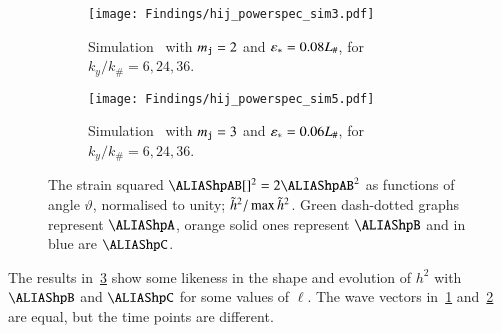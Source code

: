 
    \begin{figure}[h!]
        \centering
        \begin{subfigure}[b]{\linewidth}
            \centering
            \texttt{[image: Findings/hij\_powerspec\_sim3.pdf]}
        \caption{Simulation~ with $m_{\mathtt{j}}=2$ and $\varepsilon_\ast=0.08L_\#$, for $k_y/k_\#=6,24,36$. }
        \label{fig:results:h11:hij_powerspec_sim3}
        \end{subfigure}
        \hfill
        \begin{subfigure}[b]{\linewidth}
            \texttt{[image: Findings/hij\_powerspec\_sim5.pdf]}
        \caption{Simulation~ with $m_{\mathtt{j}}=3$ and $\varepsilon_\ast=0.06L_\#$, for $k_y/k_\#=6,24,36$.}
        \label{fig:results:h11:hij_powerspec_sim5}
        \end{subfigure}
        \caption{%
        The strain squared $\hpAB[]^2 = 2\hpAB^2$ as functions of angle $\vartheta$, normalised to unity; $\tilde{h}^2/\max{\tilde{h}^2}$. %
        Green dash-dotted graphs represent $\hpA$, orange solid ones represent $\hpB$ and in blue are $\hpC$.}
        \label{fig:results:h11:hij_powerspecs}
    \end{figure}




    The results in~\cref{fig:results:h11:hij_powerspecs} show some likeness in the shape and evolution of $h^2$ with $\hpB$ and $\hpC$ for some values of $\ell$. The wave vectors in~\cref{fig:results:h11:hij_powerspec_sim3} and~\cref{fig:results:h11:hij_powerspec_sim5} are equal, but the time points are different.

    















